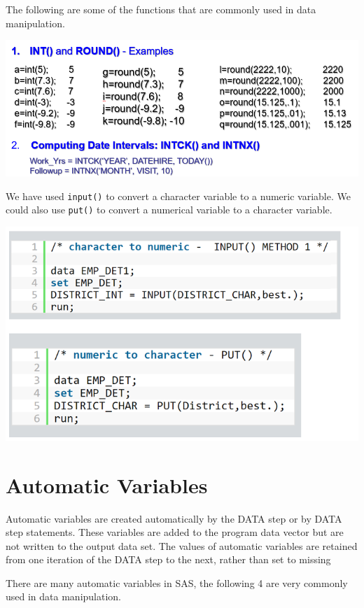 \documentclass[
]{book}
\begin{document}
The following are some of the functions that are commonly used in data manipulation.

\begin{center}\includegraphics[width=1\linewidth]{img09/w09-RelatedSASFunctions} \end{center}

We have used \texttt{input()} to convert a character variable to a numeric variable. We could also use \texttt{put()} to convert a numerical variable to a character variable.

\begin{center}\includegraphics[width=0.8\linewidth]{img09/w09-DataConversion} \end{center}

\hypertarget{automatic-variables}{%
\section{Automatic Variables}\label{automatic-variables}}

Automatic variables are created automatically by the DATA step or by DATA step statements. These variables are added to the program data vector but are not written to the output data set. The values of automatic variables are retained from one iteration of the DATA step to the next, rather than set to missing

There are many automatic variables in SAS, the following 4 are very commonly used in data manipulation.
\end{document}
